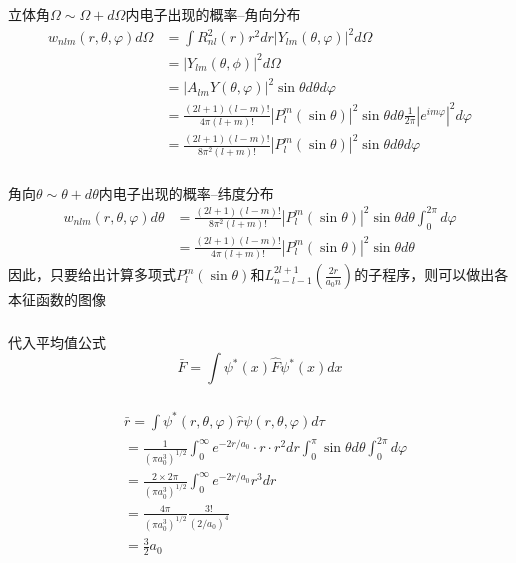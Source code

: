 \begin{frame}[label=current]
\frametitle{}
立体角$\Omega \sim \Omega + d\Omega $内电子出现的概率--角向分布
$$
\begin{aligned}
w_{n l m}(r, \theta, \varphi) d\Omega 
& =\int R^2_{n l}(r) r^2 d r  \left|Y_{l m}(\theta, \varphi)\right|^2 d\Omega \\
&= \left|Y_{l m}(\theta, \phi)\right|^2 d\Omega  \\
&= \left|A_{lm}Y(\theta,\varphi)\right|^2 \sin \theta d \theta d \varphi \\
&= \frac{(2l+1)(l-m)!}{4\pi (l+m)!}\left|  P^m _{l}(\sin\theta)\right|^2 \sin \theta d \theta  \frac{1}{2\pi} |e^{im\varphi}|^2d \varphi \\
&=\frac{(2l+1)(l-m)!}{8\pi ^2 (l+m)!}\left|  P^m _{l}(\sin\theta)\right|^2 \sin \theta d \theta d \varphi
\end{aligned}
$$
\end{frame} 

\begin{frame}[label=current]
\frametitle{}
角向$\theta \sim \theta + d\theta $内电子出现的概率--纬度分布
$$
\begin{aligned}
w_{n l m}(r, \theta, \varphi) d \theta 
&=\frac{(2l+1)(l-m)!}{8\pi ^2 (l+m)!}\left|  P^m _{l}(\sin\theta)\right|^2 \sin \theta d \theta \int_0^{2\pi} d \varphi \\
&=\frac{(2l+1)(l-m)!}{4\pi (l+m)!}\left|  P^m _{l}(\sin\theta)\right|^2 \sin \theta d \theta 
\end{aligned}
$$
因此，只要给出计算多项式$P^m _{l}(\sin\theta)$和$ L_{n-l-1} ^{2l+1} (\frac{2r}{a_0 n})$的子程序，则可以做出各本征函数的图像 
\end{frame} 

\begin{frame}[label=current]
  \frametitle{}
\解 代入平均值公式$$
\bar{F}=\int \psi^*(x) \hat{F} \psi^*(x) d x
$$
\end{frame} 

\begin{frame}[label=current]
  \frametitle{}
  $$
  \begin{aligned}
  & \bar{r}=\int \psi^*(r, \theta, \varphi) \hat{r} \psi(r, \theta, \varphi) d \tau \\
  &= \frac{1}{\left(\pi a_0^3\right)^{1 / 2}} \int_0^{\infty}   e^{-2 r / a_0} \cdot r \cdot r^2 d r\int_0^\pi\sin \theta  d \theta \int_0^{2 \pi}d \varphi \\
  & =\frac{2 \times 2 \pi}{\left(\pi a_0^3\right)^{1 / 2}} \int_0^{\infty} e^{-2 r / a_0} r^3 d r \\
  & =\frac{4 \pi}{\left(\pi a_0^3\right)^{1 / 2}} \frac{3 !}{\left(2 / a_0\right)^4}\\
  &=\frac{3}{2} a_0
  \end{aligned}
  $$
\end{frame} 

